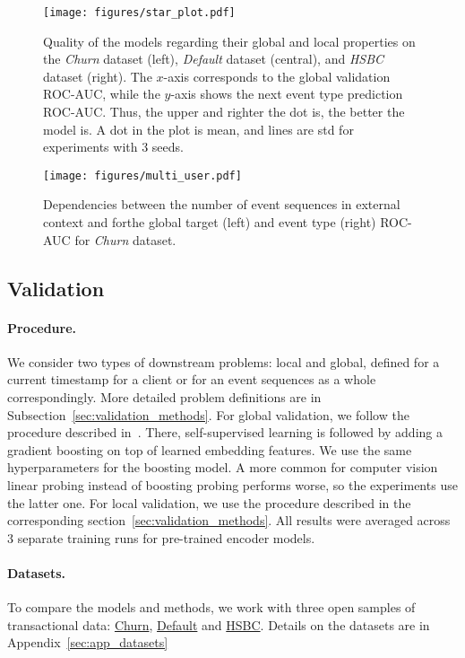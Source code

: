 \begin{figure*}[!th]
      \centering
          \texttt{[image: figures/star\_plot.pdf]}
          \caption{\selectfont Quality of the models regarding their global and local properties on the \textit{Churn} dataset (left), \textit{Default} dataset (central), and \textit{HSBC} dataset (right). The $x$-axis corresponds to the global validation ROC-AUC, while the $y$-axis shows the next event type prediction ROC-AUC. Thus, the upper and righter the dot is, the better the model is. A dot in the plot is mean, and lines are std for experiments with 3 seeds. }\label{fig:coles}
\end{figure*}


\begin{figure}[!th]
     \centering
     \texttt{[image: figures/multi\_user.pdf]}
     \caption{Dependencies between the number of event sequences in external context and forthe  global target (left) and event type (right) ROC-AUC for \textit{Churn} dataset. }
     \label{fig:iters}
\end{figure}

\subsection{Validation}

\paragraph{Procedure.} We consider two types of downstream problems: local and global, defined for a current timestamp for a client or for an event sequences as a whole correspondingly. More detailed problem definitions are in Subsection~\ref{sec:validation_methods}. For global validation, we follow the procedure described in~\cite{babaev2022coles}.
There, self-supervised learning is followed by adding a gradient boosting on top of learned embedding features. 
We use the same hyperparameters for the boosting model.
A more common for computer vision~\cite{grill2020bootstrap} linear probing instead of boosting probing performs worse, so the experiments use the latter one. 
For local validation, we use the procedure described in the corresponding section~\ref{sec:validation_methods}.
All results were averaged across $3$ separate training runs for pre-trained encoder models. 

\paragraph{Datasets.} %
To compare the models and methods, we work with three open samples of transactional data: \href{https://boosters.pro/championship/rosbank1}{Churn}, \href{https://boosters.pro/championship/alfabattle2}{Default} and \href{https://www.kaggle.com/datasets/ashisparida/hsbc-ml-hackathon-2023}{HSBC}.
Details on the datasets are in Appendix~\ref{sec:app_datasets}





